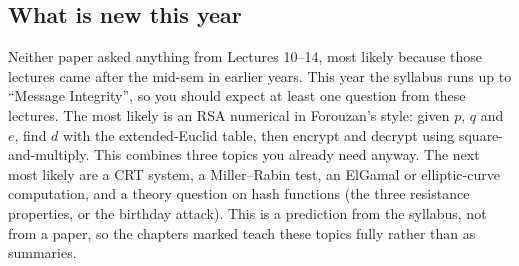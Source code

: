 \subsection{What is new this year \new}
Neither paper asked anything from Lectures 10--14, most likely because those lectures came after the mid-sem in earlier years. This year the syllabus runs up to ``Message Integrity'', so you should expect at least one question from these lectures. The most likely is an RSA numerical in Forouzan's style: given $p$, $q$ and $e$, find $d$ with the extended-Euclid table, then encrypt and decrypt using square-and-multiply. This combines three topics you already need anyway. The next most likely are a CRT system, a Miller--Rabin test, an ElGamal or elliptic-curve computation, and a theory question on hash functions (the three resistance properties, or the birthday attack). This is a prediction from the syllabus, not from a paper, so the chapters marked \new teach these topics fully rather than as summaries.

